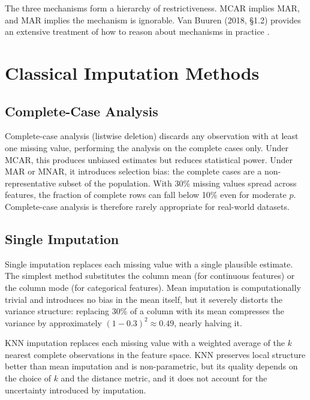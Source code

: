The three mechanisms form a hierarchy of restrictiveness. MCAR implies MAR, and MAR implies the mechanism is ignorable. Van Buuren (2018, \S1.2) provides an extensive treatment of how to reason about mechanisms in practice \cite{vanBuuren2018}.


\section{Classical Imputation Methods}

\subsection{Complete-Case Analysis}

Complete-case analysis (listwise deletion) discards any observation with at least one missing value, performing the analysis on the complete cases only. Under MCAR, this produces unbiased estimates but reduces statistical power. Under MAR or MNAR, it introduces selection bias: the complete cases are a non-representative subset of the population. With 30\% missing values spread across features, the fraction of complete rows can fall below 10\% even for moderate $p$. Complete-case analysis is therefore rarely appropriate for real-world datasets.

\subsection{Single Imputation}

Single imputation replaces each missing value with a single plausible estimate. The simplest method substitutes the column mean (for continuous features) or the column mode (for categorical features). Mean imputation is computationally trivial and introduces no bias in the mean itself, but it severely distorts the variance structure: replacing 30\% of a column with its mean compresses the variance by approximately $(1 - 0.3)^2 \approx 0.49$, nearly halving it.

KNN imputation \cite{Troyanskaya2001} replaces each missing value with a weighted average of the $k$ nearest complete observations in the feature space. KNN preserves local structure better than mean imputation and is non-parametric, but its quality depends on the choice of $k$ and the distance metric, and it does not account for the uncertainty introduced by imputation.

